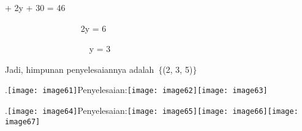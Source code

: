\documentclass[11pt,fleqn]{book} %
\begin{document}
 + 2y + 30 = 46

\noindent ~~~~~~~~~~~~~~~~~ 2y = 6

\noindent ~~~~~~~~~~~~~~~~~~~ y = 3

\noindent Jadi, himpunan penyelesaiannya adalah~$\{$(2, 3, 5)$\}$

\noindent 

.\texttt{[image: image61]}Penyelesaian:\texttt{[image: image62]}\texttt{[image: image63]}

.\texttt{[image: image64]}Penyelesaian:\texttt{[image: image65]}\texttt{[image: image66]}\texttt{[image: image67]}

\noindent 

\noindent 

\noindent

\end{document}

